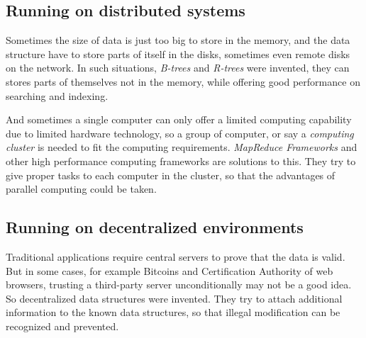 \documentclass[scheme=plain,12pt]{ctexart}
\begin{document}
    \subsection{Running on distributed systems}

    Sometimes the size of data is just too big to store in the memory, and the data structure
    have to store parts of itself in the disks, sometimes even remote disks on the network.
    In such situations, \emph{B-trees} and \emph{R-trees} were invented, they can stores parts
    of themselves not in the memory, while offering good performance on searching and indexing.

    And sometimes a single computer can only offer a limited computing capability due to
    limited hardware technology, so a group of computer, or say a \emph{computing cluster} is
    needed to fit the computing requirements. \emph{MapReduce Frameworks} and other high
    performance computing frameworks are solutions to this. They try to give proper tasks
    to each computer in the cluster, so that the advantages of parallel computing could be
    taken.

    \subsection{Running on decentralized environments}

    Traditional applications require central servers to prove that the data is valid. But in
    some cases, for example Bitcoins and Certification Authority of web browsers, trusting a
    third-party server unconditionally may not be a good idea. So decentralized data structures
    were invented. They try to attach additional information to the known data structures,
    so that illegal modification can be recognized and prevented.
\end{document}
